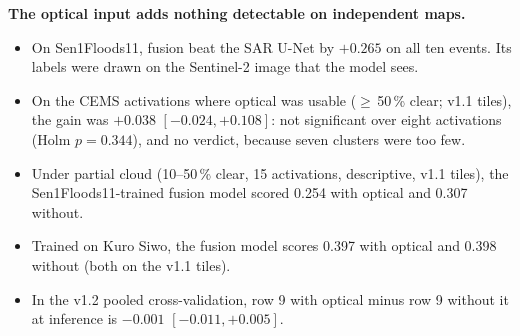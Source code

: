 \documentclass[10pt,twocolumn,a4paper]{article}
\newcommand{\pp}{\,\%}
\begin{document}
\textbf{The optical input adds nothing detectable on independent maps.}
\begin{itemize}
  \item On Sen1Floods11, fusion beat the SAR U-Net by $+0.265$ on all ten events. Its labels were drawn on the
    Sentinel-2 image that the model sees.
  \item On the CEMS activations where optical was usable ($\geq$\,50\pp{} clear; v1.1 tiles), the gain was $+0.038$
    $[-0.024, +0.108]$: not significant over eight activations (Holm $p=0.344$), and no verdict, because seven
    clusters were too few.
  \item Under partial cloud (10--50\pp{} clear, 15 activations, descriptive, v1.1 tiles), the Sen1Floods11-trained fusion model
    scored 0.254 with optical and 0.307 without.
  \item Trained on Kuro Siwo, the fusion model scores 0.397 with optical and 0.398 without (both on the v1.1 tiles).
  \item In the v1.2 pooled cross-validation, row 9 with optical minus row 9 without it at inference is $-0.001$
    $[-0.011, +0.005]$.
\end{itemize}
\end{document}
